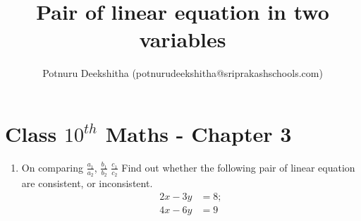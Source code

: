\documentclass[12pt]{article}
\title{Pair of linear equation in two variables}
\author{Potnuru Deekshitha (potnurudeekshitha@sriprakashschools.com)}
\begin{document}
\maketitle
\section*{Class $10^{th}$ Maths - Chapter 3}

\begin{enumerate}
 \item On comparing $\frac{a_1}{a_2}$, $\frac{b_1}{b_2}$ $\frac{c_1}{c_2} $
Find out whether the following pair of linear equation are consistent, or inconsistent.
\begin{align}
 2x-3y&=8;\\
 4x-6y&=9
\end{align}




\end{enumerate}
\end{document}
